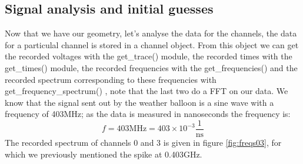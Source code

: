 \documentclass[11pt,a4paper,faculty=we,language=en,doctype=report]{cls/ugent-doc}
\begin{document}
\subsection{Signal analysis and initial guesses}
Now that we have our geometry, let's analyse the data for the channels,
the data for a particulal channel is stored in a channel object. From this
object we can get the recorded voltages with the get\_trace() module, the
recorded times with the get\_times() module, the recorded frequencies with the
get\_frequencies() and the recorded spectrum corresponding to these frequencies
with get\_frequency\_spectrum() , note that the last two do a FFT on our data.
We know that the signal sent out by the weather balloon is a sine wave with a
frequency of 403MHz; as the data is measured in nanoseconds the frequency is:
\begin{equation}
	f = 403\text{MHz} = 403\times 10^{-3} \frac{1}{\text{ns}}
\end{equation}
The recorded spectrum of channels 0 and 3 is given in figure \ref{fig:freqs03}, for 
which we previously mentioned the spike at 0.403GHz.
\end{document}
